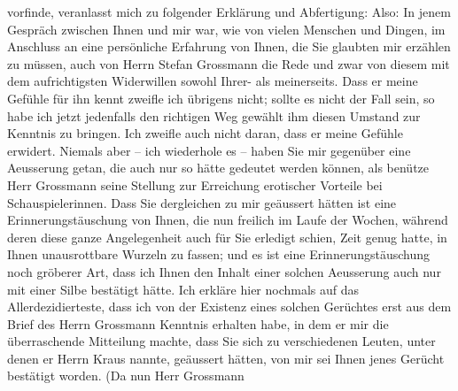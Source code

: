\begin{ledgroupsized}[t]{13cm}
               vorfinde, veranlasst mich zu folgender Erklärung und Abfertigung:\pend
           \pstart
           Also: In jenem Gespräch zwischen Ihnen und mir war, wie von vielen Menschen und
               Dingen, im Anschluss an eine persönliche Erfahrung von Ihnen, die Sie glaubten mir
               erzählen zu müssen, auch von Herrn Stefan
                  Grossmann die Rede und zwar von diesem mit dem aufrichtigsten Widerwillen
               sowohl Ihrer- als meinerseits. Dass er meine Gefühle für ihn kennt zweifle ich
               übrigens nicht; sollte es nicht der Fall sein, so habe ich jetzt jedenfalls den
               richtigen {\pb}Weg gewählt ihm diesen Umstand zur Kenntnis zu
               bringen. Ich zweifle auch nicht daran, dass er meine Gefühle erwidert. Niemals aber –
               ich wiederhole es – haben Sie mir gegenüber eine Aeusserung getan, die auch nur so
               hätte gedeutet werden können, als benütze Herr Grossmann seine Stellung zur Erreichung erotischer Vorteile bei
               Schauspielerinnen. Dass Sie dergleichen zu mir geäussert hätten ist eine
               Erinnerungstäuschung von Ihnen, die nun freilich im Laufe der Wochen, während deren
               diese ganze Angelegenheit \introOben{}auch\introOben{} für Sie erledigt
               schien, Zeit genug hatte, in Ihnen unausrottbare Wurzeln zu fassen; und es ist eine
               Erinnerungstäuschung noch gröberer Art, dass ich Ihnen den Inhalt einer solchen
               Aeusserung auch nur mit einer Silbe bestätigt hätte. Ich erkläre hier nochmals auf
               das Allerdezidierteste, dass ich von der Existenz eines solchen Gerüchtes erst aus
               dem Brief des Herrn Grossmann Kenntnis erhalten
               habe, in dem er mir die überraschende Mitteilung machte, dass Sie sich zu
               verschiedenen Leuten, unter denen er Herrn Kraus
               nannte, geäussert hätten, von mir sei Ih{\pb}nen jenes Gerücht
               bestätigt worden. (Da nun Herr Grossmann

\end{ledgroupsized}
